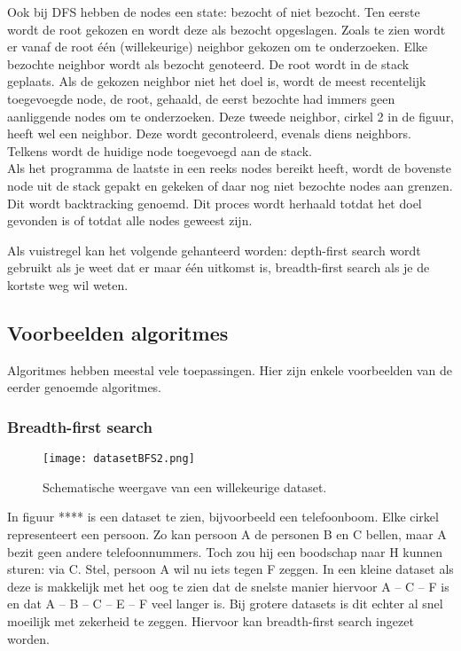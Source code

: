 Ook bij DFS hebben de nodes een state: bezocht of niet bezocht.
Ten eerste wordt de root gekozen en wordt deze als bezocht opgeslagen. Zoals te zien wordt er vanaf de root één (willekeurige) neighbor gekozen om te onderzoeken. Elke bezochte neighbor wordt als bezocht genoteerd. De root wordt in de stack geplaats. Als de gekozen neighbor niet het doel is, wordt de meest recentelijk toegevoegde node, de root, gehaald, de eerst bezochte had immers geen aanliggende nodes om te onderzoeken. Deze tweede neighbor, cirkel 2 in de figuur, heeft wel een neighbor. Deze wordt gecontroleerd, evenals diens neighbors. Telkens wordt de huidige node toegevoegd aan de stack.\\
Als het programma de laatste in een reeks nodes bereikt heeft, wordt de bovenste node uit de stack gepakt en gekeken of daar nog niet bezochte nodes aan grenzen. Dit wordt backtracking genoemd.
Dit proces wordt herhaald totdat het doel gevonden is of totdat alle nodes geweest zijn.

Als vuistregel kan het volgende gehanteerd worden: depth-first search wordt gebruikt als je weet dat er maar één uitkomst is, breadth-first search als je de kortste weg wil weten.
\subsection{Voorbeelden algoritmes}
Algoritmes hebben meestal vele toepassingen. Hier zijn enkele voorbeelden van de eerder genoemde algoritmes.
\subsubsection{Breadth-first search}
\begin{figure}[h]
  \centering
    \texttt{[image: datasetBFS2.png]}
  \caption{Schematische weergave van een willekeurige dataset.}
  \label{fig:datasetBFS2}
\end{figure}

In figuur **** is een dataset te zien, bijvoorbeeld een telefoonboom. Elke cirkel representeert een persoon. Zo kan persoon A de personen B en C bellen, maar A bezit geen andere telefoonnummers. Toch zou hij een boodschap naar H kunnen sturen: via C. 
Stel, persoon A wil nu iets tegen F zeggen. In een kleine dataset als deze is makkelijk met het oog te zien dat de snelste manier hiervoor A – C – F is en dat A – B – C – E – F veel langer is. Bij grotere datasets is dit echter al snel moeilijk met zekerheid te zeggen. Hiervoor kan breadth-first search ingezet worden.

